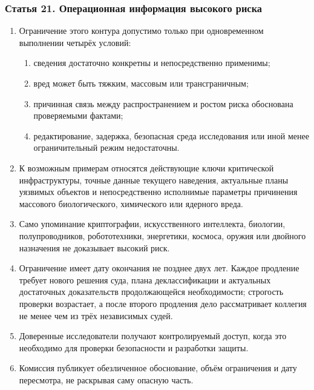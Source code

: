 \documentclass[
  russian,
  11pt,
  a4paper,
]{article}
\providecommand{\tightlist}{%
  \setlength{\itemsep}{0pt}\setlength{\parskip}{0pt}}
\begin{document}
\subsubsection{Статья 21. Операционная информация высокого
риска}\label{ux441ux442ux430ux442ux44cux44f-21-ux43eux43fux435ux440ux430ux446ux438ux43eux43dux43dux430ux44f-ux438ux43dux444ux43eux440ux43cux430ux446ux438ux44f-ux432ux44bux441ux43eux43aux43eux433ux43e-ux440ux438ux441ux43aux430}

\begin{enumerate}
\def\labelenumi{\arabic{enumi}.}
\tightlist
\item
  Ограничение этого контура допустимо только при одновременном
  выполнении четырёх условий:

  \begin{enumerate}
  \def\labelenumii{\arabic{enumii}.}
  \tightlist
  \item
    сведения достаточно конкретны и непосредственно применимы;
  \item
    вред может быть тяжким, массовым или трансграничным;
  \item
    причинная связь между распространением и ростом риска обоснована
    проверяемыми фактами;
  \item
    редактирование, задержка, безопасная среда исследования или иной
    менее ограничительный режим недостаточны.
  \end{enumerate}
\item
  К возможным примерам относятся действующие ключи критической
  инфраструктуры, точные данные текущего наведения, актуальные планы
  уязвимых объектов и непосредственно исполнимые параметры причинения
  массового биологического, химического или ядерного вреда.
\item
  Само упоминание криптографии, искусственного интеллекта, биологии,
  полупроводников, робототехники, энергетики, космоса, оружия или
  двойного назначения не доказывает высокий риск.
\item
  Ограничение имеет дату окончания не позднее двух лет. Каждое продление
  требует нового решения суда, плана деклассификации и актуальных
  достаточных доказательств продолжающейся необходимости; строгость
  проверки возрастает, а после второго продления дело рассматривает
  коллегия не менее чем из трёх независимых судей.
\item
  Доверенные исследователи получают контролируемый доступ, когда это
  необходимо для проверки безопасности и разработки защиты.
\item
  Комиссия публикует обезличенное обоснование, объём ограничения и дату
  пересмотра, не раскрывая саму опасную часть.
\end{enumerate}
\end{document}
